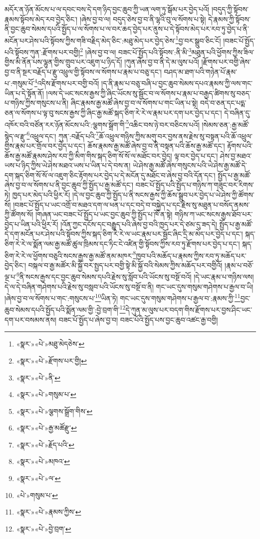མདོར་ན་ཉོན་མོངས་པ་ལ་དབང་བས་དེ་དག་ཉིད་བྱང་ཆུབ་ཀྱི་ཡན་ལག་ཏུ་སྒོམ་པར་བྱེད་པའོ། །བདུད་ཀྱི་སྟོབས་རྣམས་སྟོབས་མེད་རབ་བྱེད་ཅིང་། །ཞེས་བྱ་བ་ལ། བདུད་ཅེས་བྱ་བ་ནི་ལྷའི་བུ་ལ་སོགས་པ་སྟེ། དེ་རྣམས་ཀྱི་སྟོབས་ནི་བྱང་ཆུབ་སེམས་དཔའི་སྤྱོད་པ་ལ་སོགས་པ་ལ་བར་ཆད་བྱེད་པར་ནུས་པ་དེ་སྟོབས་མེད་པར་རབ་ཏུ་བྱེད་པ་ནི་མངོན་པར་ཤེས་པའི་སྟོབས་ཀྱིས་གཟི་བརྗིད་མེད་ཅིང་:མཐུ་མེད་པར་བྱེད་ཅེས་\footnote{«སྣར་»«པེ་»མཐུ་མེདཅེས་}བྱ་བར་སྒྲུབ་ཅིང་ངོ། །བཟང་པོ་སྤྱོད་པའི་སྟོབས་ཀུན་:རྫོགས་པར་བགྱི།\footnote{«སྣར་»«པེ་»རྫོགས་པར་གྱི།} །ཞེས་བྱ་བ་ལ། བཟང་པོ་སྤྱོད་པའི་སྟོབས་:ནི་མི་\footnote{«སྣར་»«པེ་»ནི་}མཐུན་པའི་ཕྱོགས་ཀྱིས་ཟིལ་གྱིས་མི་ནོན་པས་ལྷུན་གྱིས་གྲུབ་པར་འཇུག་པ་ཉིད་དོ། །ཀུན་ཞེས་བྱ་བ་ནི་དེ་མ་ལུས་པའོ། །རྫོགས་པར་བགྱི་ཞེས་བྱ་བ་ནི་སྔར་བརྗོད་པ་རྫུ་འཕྲུལ་གྱི་སྟོབས་ལ་སོགས་པ་རྣམ་པ་བཅུ་དང་། བཤད་མ་ཐག་པའི་གཉེན་པོ་རྣམ་པ་:གསུམ་པོ་\footnote{«སྣར་»«པེ་»གསུམ་པ་}འདིས་རྫོགས་པར་བགྱི་བའོ། །ད་ནི་རྣམ་པ་བཅུ་བཞི་པ་བྱང་ཆུབ་སེམས་དཔའ་རྣམས་ཀྱི་ལས་གང་ཡིན་པ་དེ་སྟོན་ནོ། །ལས་དེ་ཡང་སངས་རྒྱས་ཀྱི་ཞིང་ཡོངས་སུ་སྦྱོང་བ་ལ་སོགས་པ་རྣམ་པ་བརྒྱད་ཚིགས་སུ་བཅད་པ་གཉིས་ཀྱིས་གསུངས་པ་ནི། ཞིང་རྣམས་རྒྱ་མཚོ་ཞེས་བྱ་བ་ལ་སོགས་པ་གང་ཡིན་པ་སྟེ། བདེ་བ་ཅན་དང་པདྨ་ཅན་ལ་སོགས་པ་ལྟ་བུ་སངས་རྒྱས་ཀྱི་ཞིང་རྒྱ་མཚོ་སྐད་ཅིག་རེ་རེ་ལ་རྣམ་པར་དག་པར་བྱེད་པ་དང་། དེ་བཞིན་དུ་འཁོར་བའི་བཙོན་རར་ཉོན་མོངས་པའི་:ལྕགས་སྒྲོག་གི་\footnote{«སྣར་»«པེ་»ལྕགས་སྒྲོག་གིས་}འཆིང་བས་ཉེ་བར་བཅིངས་པའོ། །སེམས་ཅན་:རྒྱ་མཚོ་སྙེད་ལ་རྫུ་\footnote{«སྣར་»«པེ་»རྒྱ་མཚོརྫུ་}འཕྲུལ་དང་། ཀུན་:བརྗོད་པའི་\footnote{«སྣར་»«པེ་»རྗོད་པའི་}ཆོ་འཕྲུལ་གཉིས་ཀྱིས་མགུ་བར་བྱས་ནས་རྗེས་སུ་བསྟན་པའི་ཆོ་འཕྲུལ་གྱིས་རྣམ་པར་གྲོལ་བར་བྱེད་པ་དང་། ཆོས་རྣམས་རྒྱ་མཚོ་ཞེས་བྱ་བ་ནི་བསྟན་པའི་ཆོས་རྒྱ་མཚོ་དང་། རྟོགས་པའི་ཆོས་རྒྱ་མཚོ་རྣམས་ཤེས་རབ་ཀྱི་མིག་གིས་སྐད་ཅིག་སོ་སོ་ལ་མཐོང་བར་བྱེད། ལྟ་བར་བྱེད་པ་དང་། ཤེས་བྱ་མཐའ་ཡས་པ་ཉིད་ཀྱིས་ཡེ་ཤེས་མཐའ་ཡས་པ་ཡིན་པ་དེ་བས་ན། ཡེ་ཤེས་རྒྱ་མཚོ་ཞེས་གསུངས་པའི་ཡེ་ཤེས་རྒྱ་མཚོ་དེ་དག་སྐད་ཅིག་སོ་སོ་ལ་འཇུག་ཅིང་རྟོགས་པར་བྱེད་པ་དེ་མངོན་དུ་མཐོང་བ་ཞེས་བྱ་བའི་དོན་དང་། སྤྱོད་པ་རྒྱ་མཚོ་ཞེས་བྱ་བ་ལ་སོགས་པ་ནི་བྱང་ཆུབ་ཀྱི་སྤྱོད་པ་རྒྱ་མཚོ་དང་། བཟང་པོ་སྤྱོད་པའི་སྤྱོད་པ་གཉིས་ཀ་གཟུང་བར་རིགས་ཏེ། ཁྱད་པར་མེད་པའི་ཕྱིར་རོ། །དེ་ལ་བྱང་ཆུབ་ཀྱི་སྤྱོད་པ་ནི་སངས་རྒྱས་ཀྱི་ཆོས་སྒྲུབ་པར་བྱེད་པ་ཡེ་ཤེས་ཀྱི་ཚོགས་སོ། །བཟང་པོ་སྤྱོད་པ་ཡང་འགྲོ་བ་མཐའ་དག་ལ་ཕན་པ་དང་བདེ་བ་བསྐྱེད་པ་དང་རྗེས་སུ་མཐུན་པ་བསོད་ནམས་ཀྱི་ཚོགས་སོ། །གཞན་ཡང་བཟང་པོ་སྤྱོད་པ་ཡང་བྱང་ཆུབ་ཀྱི་སྤྱོད་པ་ཁོ་ན་སྟེ། གཉིས་ཀ་ཡང་སངས་རྒྱས་ཐོབ་པར་བྱེད་པ་ཡིན་པའི་ཕྱིར་རོ། །འོན་ཀྱང་དངོས་དང་བརྒྱུད་པའི་ཞེས་བྱ་བའི་ཁྱད་པར་དེ་ཙམ་དུ་ཟད་དེ། སྤྱོད་པ་རྒྱ་མཚོ་དེ་དག་མངོན་པར་ཤེས་པའི་སྟོབས་ཀྱིས་སྐད་ཅིག་རེ་རེ་ལ་ཡང་རྣམ་པར་སྦྱོང་ཞིང་དྲི་མ་མེད་པར་བྱེད་པ་དང་། སྐད་ཅིག་རེ་རེ་ལ་སྨོན་ལམ་རྒྱ་མཚོ་ཚུལ་ཁྲིམས་དང་ཏིང་ངེ་འཛིན་གྱི་སྟོབས་ཀྱིས་རབ་ཏུ་རྫོགས་པར་བྱེད་པ་དང་། སྐད་ཅིག་རེ་རེ་ལ་ཕྱོགས་བཅུའི་སངས་རྒྱས་རྒྱ་མཚོ་ནམ་མཁར་\footnote{«སྣར་»«པེ་»མཁའ་}ཁྱབ་པའི་མཆོད་པ་རྣམས་ཀྱིས་རབ་ཏུ་མཆོད་པར་བྱེད་ཅིང་། བསྐལ་བ་རྒྱ་མཚོར་མི་སྐྱོ་བར་སྤྱད་པར་བགྱི་སྟེ་མི་སྐྱོ་བའི་སེམས་ཀྱིས་མཆོད་པར་བགྱིའོ། །རྣམ་པ་བཅོ་ལྔ་པ་\footnote{«སྣར་»«པེ་»ལ་}ནི་སངས་རྒྱས་དང་བྱང་ཆུབ་སེམས་དཔའི་རྗེས་སུ་སློབ་པའི་ཡོངས་སུ་བསྔོ་བའོ། །དེ་ཡང་རྣམ་པ་གཉིས་ལས། དེ་ལ་དེ་བཞིན་གཤེགས་པའི་རྗེས་སུ་བསླབ་པའི་ཡོངས་སུ་བསྔོ་བ་ནི། གང་ཡང་དུས་གསུམ་གཤེགས་པ་རྒྱལ་བ་ཡི། །ཞེས་བྱ་བ་ལ་སོགས་པ་གང་:གསུངས་པ་\footnote{«པེ་»གསུམ་པ་}ཡིན་ཏེ། གང་ཡང་དུས་གསུམ་གཤེགས་པ་རྒྱལ་བ་:རྣམས་ཀྱི་\footnote{«སྣར་»«པེ་»རྣམས་ཀྱིས་}བྱང་ཆུབ་སེམས་དཔའི་སྤྱོད་པའི་སྨོན་ལམ་གྱི་:བྱེ་བྲག་གི་\footnote{«སྣར་»«པེ་»བྱེ་བྲག་}དེ་ཀུན་མ་ལུས་པར་བདག་གིས་རྫོགས་པར་བྱས་ཤིང་ཡང་དག་པར་བསམས་ནས། བཟང་པོ་སྤྱོད་པ་ཞེས་བྱ་བ། བཟང་པོའི་སྤྱོད་པས་བྱང་ཆུབ་འཚང་རྒྱ་བགྱི། 